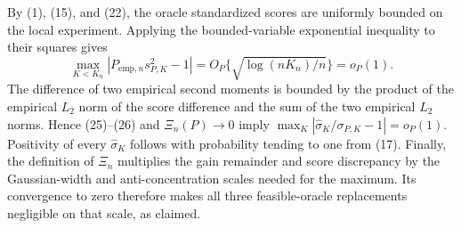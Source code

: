 By (1), (15), and (22), the oracle standardized scores are uniformly bounded on the local experiment.  Applying the bounded-variable exponential inequality to their squares gives
\[
 \max_{K<K_n}|P_{\mathrm{emp},n}s_{P,K}^2-1|=O_P\{\sqrt{\log(nK_n)/n}\}=o_P(1). \tag{26}
\]
The difference of two empirical second moments is bounded by the product of the empirical \(L_2\) norm of the score difference and the sum of the two empirical \(L_2\) norms.  Hence (25)--(26) and \(\Xi_n(P)\to0\) imply \(\max_K|\widehat\sigma_K/\sigma_{P,K}-1|=o_P(1)\).  Positivity of every \(\widehat\sigma_K\) follows with probability tending to one from (17).  Finally, the definition of \(\Xi_n\) multiplies the gain remainder and score discrepancy by the Gaussian-width and anti-concentration scales needed for the maximum.  Its convergence to zero therefore makes all three feasible-oracle replacements negligible on that scale, as claimed.
